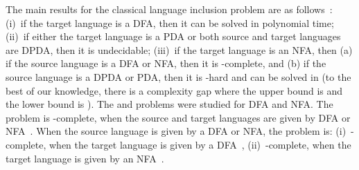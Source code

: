 \documentclass{CSML}
\begin{document}
\smallskip{}
The main results for the classical language inclusion problem are as follows~\cite{HU79}: 
(i)~if the target language is a DFA, then it can be solved in polynomial time;
(ii)~if either the target language is a PDA or both source and target languages are DPDA, 
then it is undecidable; 
(iii)~if the target language is an NFA, then (a) if the source language
is a DFA or NFA, then it is -complete, and (b) if the source language 
is a DPDA or PDA, then it is -hard and can be solved in  
(to the best of our knowledge, there is a complexity gap where the upper 
bound is  and the lower bound is ). 
The  and  problems were studied for DFA and NFA. 
The  problem is -complete, when the source and target languages are 
given by DFA or NFA~\cite{riveros,boundedRiveros}. 
When the source language is given by a DFA or NFA, the  problem is: 
(i)~-complete, when the target language is given by a DFA~\cite{boundedRiveros},
(ii)~-complete, when the target language is given by an NFA~\cite{boundedRiveros}.
\end{document}

